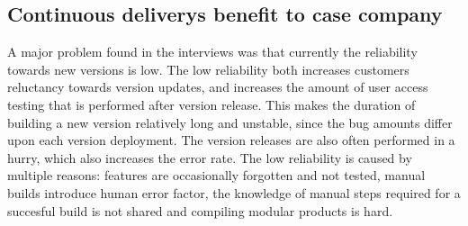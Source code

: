 \documentclass[english]{tktltiki2}
\theoremstyle{definition}
\theoremstyle{remark}
\begin{document}








\subsection{Continuous deliverys benefit to case company}





A major problem found in the interviews was that currently the reliability towards new versions is low. The low reliability both increases customers reluctancy towards version updates, and increases the amount of user access testing that is performed after version release. This makes the duration of building a new version relatively long and unstable, since the bug amounts differ upon each version deployment. The version releases are also often performed in a hurry, which also increases the error rate. The low reliability is caused by multiple reasons: features are occasionally forgotten and not tested, manual builds introduce human error factor, the knowledge of manual steps required for a succesful build is not shared and compiling modular products is hard.
\end{document}
